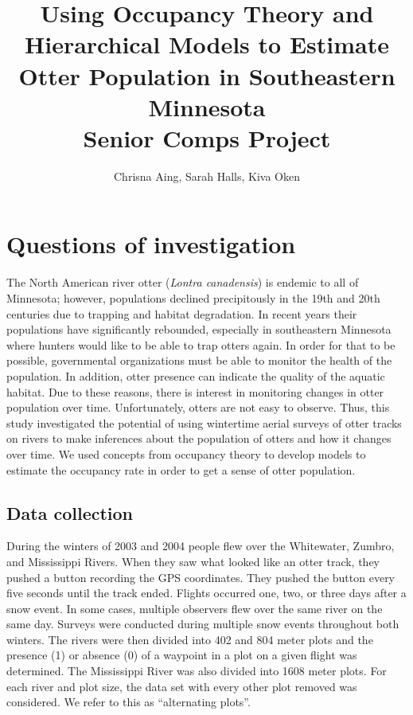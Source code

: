 \documentclass[12pt]{article}
\begin{document}
\title{Using Occupancy Theory and Hierarchical Models to Estimate Otter
Population in Southeastern Minnesota \\
{\large Senior Comps Project}}
\author{Chrisna Aing, Sarah Halls, Kiva Oken}
\maketitle

\section{Questions of investigation}
The North American river otter (\textit{Lontra canadensis}) is endemic to all of
Minnesota; however, populations declined precipitously in the 19th and 20th
centuries due to trapping and habitat degradation. In recent years their
populations have significantly rebounded, especially in southeastern Minnesota
where hunters would like to be able to trap otters again. In order for that to
be possible, governmental organizations must be able to monitor the health of
the population.
In addition, otter presence can indicate the quality of the aquatic habitat.
Due to these reasons, there is interest in monitoring changes in otter
population
over time. Unfortunately, otters are not easy to observe. Thus, this study
investigated the potential of using wintertime aerial surveys of otter tracks on
rivers to make inferences about the population of otters and how it changes over
time. We used concepts from occupancy theory to develop models to estimate
the occupancy rate in order to get a sense of otter population.

    \subsection{Data collection}
    During the winters of 2003 and 2004 people flew over the Whitewater, Zumbro,
    and Mississippi Rivers. When they saw what looked like an otter track, they
    pushed a button recording the GPS coordinates. They pushed the button every
    five seconds until the track ended. Flights occurred one, two, or three days
    after a snow event. In some cases, multiple observers flew over the same
    river on the same day. Surveys were conducted during multiple snow events
    throughout both winters. The rivers were then divided into 402 and 804 meter
    plots and the presence (1) or absence (0) of a waypoint in a plot on a given
    flight was determined. The Mississippi River was also divided into 1608
    meter plots.  For each river and plot size, the data set with every other
    plot removed was considered.  We refer to this as ``alternating plots''.
\end{document}
